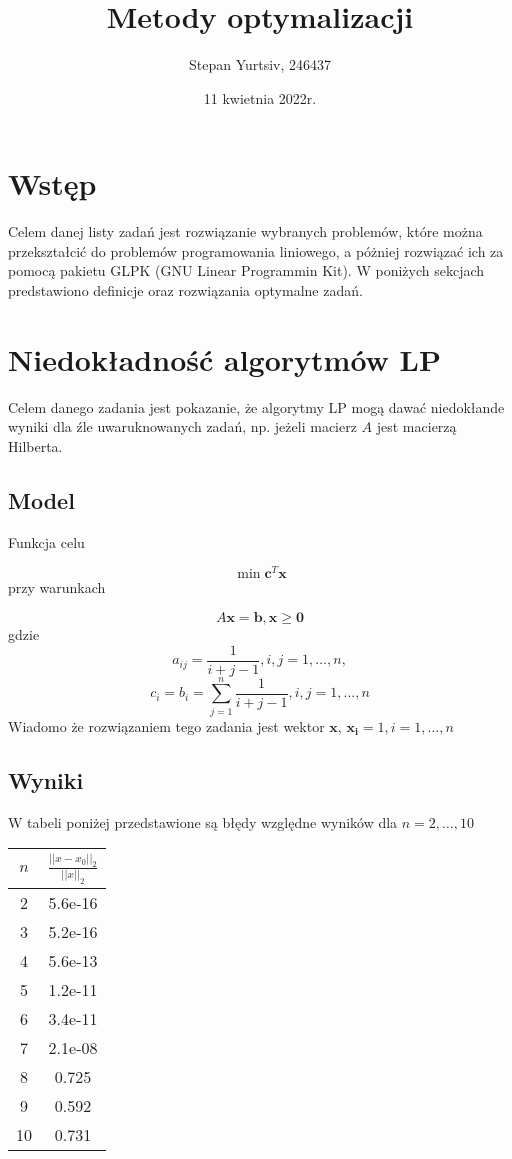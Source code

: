 \documentclass[12pt, a4paper]{article}
\title{Metody optymalizacji}
\author{Stepan Yurtsiv, 246437}
\date{11 kwietnia 2022r.}
\begin{document}
\maketitle

\section{Wstęp}

Celem danej listy zadań jest rozwiązanie wybranych problemów, które można przekształcić do problemów
programowania liniowego, a póżniej rozwiązać ich za pomocą pakietu GLPK (GNU Linear Programmin Kit).
W poniżych sekcjach predstawiono definicje oraz rozwiązania optymalne zadań.


\section{Niedokładność algorytmów LP}

Celem danego zadania jest pokazanie, że algorytmy LP mogą dawać niedokłande
wyniki dla źle uwaruknowanych zadań, np. jeżeli macierz ${A}$ jest macierzą Hilberta.

\subsection{Model}

Funkcja celu

\[\min \bm{c}^T\bm{x}\]
przy warunkach

\[A\bm{x} = \bm{b}, \bm{x \geq 0}\]
gdzie
\[a_{ij} = \frac{1}{i + j - 1}, i, j = 1,\dots,n,\]
\[c_i = b_i = \sum_{j = 1}^{n} \frac{1}{i + j - 1}, i, j = 1,\dots,n\]
Wiadomo że rozwiązaniem tego zadania jest wektor $\bm{x}$, $\bm{x_i} = 1, i = 1,\dots,n$

\subsection{Wyniki}

W tabeli poniżej przedstawione są błędy względne wyników dla $n = 2,\dots,10$

\begin{center}
\begin{tabular}{|c|c|}
 \hline 
 $n$ & $\frac{||x - x_0||_2}{||x||_2}$ \\
 \hline 
 2 & 5.6e-16\\
 \hline
 3 & 5.2e-16\\
 \hline
 4 & 5.6e-13\\
 \hline
 5 & 1.2e-11\\
 \hline
 6 & 3.4e-11\\
 \hline
 7 & 2.1e-08\\
 \hline
 8 & 0.725\\
 \hline
 9 & 0.592\\
 \hline
 10 & 0.731\\
 \hline
\end{tabular}
\end{center}
\end{document}
